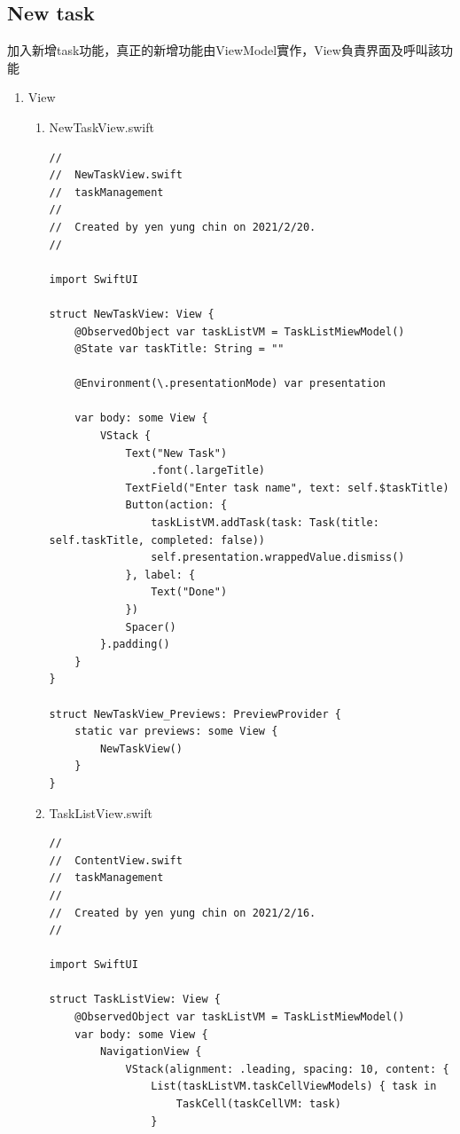 \documentclass[a4paper,12pt]{article}
\begin{document}
\subsection{New task}
\label{sec:orgd87a94c}
加入新增task功能，真正的新增功能由ViewModel實作，View負責界面及呼叫該功能\\
\begin{enumerate}
\item View
\label{sec:orgb178fa2}
\begin{enumerate}
\item NewTaskView.swift
\label{sec:orgda00a9e}
\lstset{breaklines=true,language=swift,label= ,caption= ,captionpos=b,firstnumber=1,numbers=left}
\begin{lstlisting}
//
//  NewTaskView.swift
//  taskManagement
//
//  Created by yen yung chin on 2021/2/20.
//

import SwiftUI

struct NewTaskView: View {
    @ObservedObject var taskListVM = TaskListMiewModel()
    @State var taskTitle: String = ""

    @Environment(\.presentationMode) var presentation

    var body: some View {
        VStack {
            Text("New Task")
                .font(.largeTitle)
            TextField("Enter task name", text: self.$taskTitle)
            Button(action: {
                taskListVM.addTask(task: Task(title: self.taskTitle, completed: false))
                self.presentation.wrappedValue.dismiss()
            }, label: {
                Text("Done")
            })
            Spacer()
        }.padding()
    }
}

struct NewTaskView_Previews: PreviewProvider {
    static var previews: some View {
        NewTaskView()
    }
}

\end{lstlisting}
\item TaskListView.swift
\label{sec:org3150e32}
\lstset{breaklines=true,language=swift,label= ,caption= ,captionpos=b,firstnumber=1,numbers=left}
\begin{lstlisting}
//
//  ContentView.swift
//  taskManagement
//
//  Created by yen yung chin on 2021/2/16.
//

import SwiftUI

struct TaskListView: View {
    @ObservedObject var taskListVM = TaskListMiewModel()
    var body: some View {
        NavigationView {
            VStack(alignment: .leading, spacing: 10, content: {
                List(taskListVM.taskCellViewModels) { task in
                    TaskCell(taskCellVM: task)
                }



\end{lstlisting}
\end{enumerate}
\end{enumerate}
\end{document}
